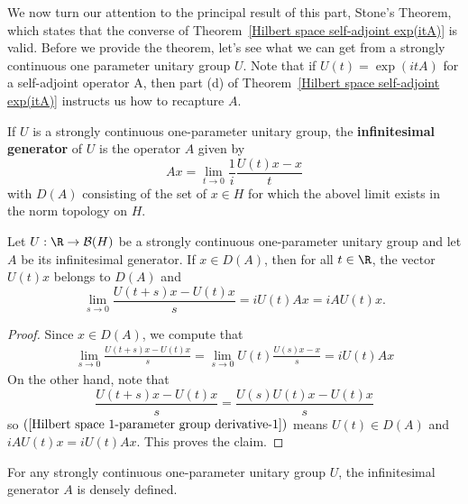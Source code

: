 We now turn our attention to the principal result of this part, Stone's Theorem, which states that the converse of Theorem~\ref{Hilbert space self-adjoint exp(itA)} is valid. Before we provide the theorem, let's see what we can get from a strongly continuous one parameter unitary group $U$. Note that if $U(t)=\exp(itA)$ for a self-adjoint operator A, then part (d) of Theorem~\ref{Hilbert space self-adjoint exp(itA)} instructs us how to recapture $A$.
\begin{definition}
If $U$ is a strongly continuous one-parameter unitary group, the \textbf{infinitesimal generator} of $U$ is the operator $A$ given by
\[Ax=\lim_{t\to 0}\frac{1}{i}\frac{U(t)x-x}{t}\]
with $D(A)$ consisting of the set of $x\in H$ for which the abovel limit exists in the norm topology on $H$.
\end{definition}
\begin{lemma}\label{Hilbert space 1-parameter group derivative}
Let $U:\R\to\mathcal{B}(H)$ be a strongly continuous one-parameter unitary group and let $A$ be its infinitesimal generator. If $x\in D(A)$, then for all $t\in\R$, the vector $U(t)x$ belongs to $D(A)$ and
\[\lim_{s\to 0}\frac{U(t+s)x-U(t)x}{s}=iU(t)Ax=iAU(t)x.\]
\end{lemma}
\begin{proof}
Since $x\in D(A)$, we compute that
\begin{align}\label{Hilbert space 1-parameter group derivative-1}
\lim_{s\to 0}\frac{U(t+s)x-U(t)x}{s}=\lim_{s\to 0}U(t)\frac{U(s)x-x}{s}=iU(t)Ax
\end{align}
On the other hand, note that
\[\frac{U(t+s)x-U(t)x}{s}=\frac{U(s)U(t)x-U(t)x}{s}\]
so $(\ref{Hilbert space 1-parameter group derivative-1})$ means $U(t)\in D(A)$ and $iAU(t)x=iU(t)Ax$. This proves the claim.
\end{proof}
\begin{lemma}\label{Hilbert space 1-parameter group generated densely defined}
For any strongly continuous one-parameter unitary group $U$, the infinitesimal generator $A$ is densely defined.
\end{lemma}
